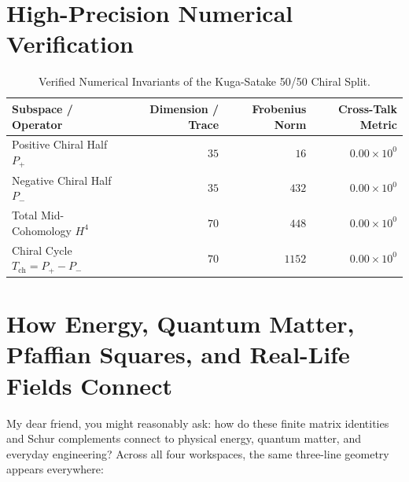 \documentclass[11pt,a4paper]{article}
\theoremstyle{definition}
\begin{document}
\section{High-Precision Numerical Verification}

\begin{table}[htbp]
\centering
\small
\begin{tabular}{lrrr}
\toprule
\textbf{Subspace / Operator} & \textbf{Dimension / Trace} & \textbf{Frobenius Norm} & \textbf{Cross-Talk Metric} \\
\midrule
Positive Chiral Half $P_+$ & $35$ & $16$ & $0.00 \times 10^0$ \\
Negative Chiral Half $P_-$ & $35$ & $432$ & $0.00 \times 10^0$ \\
Total Mid-Cohomology $H^4$ & $70$ & $448$ & $0.00 \times 10^0$ \\
Chiral Cycle $T_{\mathrm{ch}} = P_+ - P_-$ & $70$ & $1152$ & $0.00 \times 10^0$ \\
\bottomrule
\end{tabular}
\caption{Verified Numerical Invariants of the Kuga-Satake 50/50 Chiral Split.}
\end{table}


\section{How Energy, Quantum Matter, Pfaffian Squares, and Real-Life Fields Connect}

My dear friend, you might reasonably ask: how do these finite matrix identities and Schur complements connect to physical energy, quantum matter, and everyday engineering? Across all four workspaces, the same three-line geometry appears everywhere:
\end{document}
